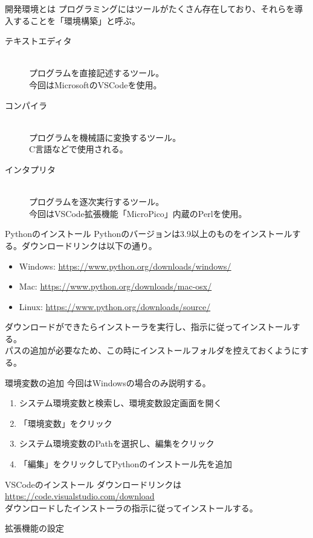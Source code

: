\documentclass[dvipdfmx]{beamer}
\begin{document}
    \begin{frame}{開発環境とは}
      プログラミングにはツールがたくさん存在しており、それらを導入することを「環境構築」と呼ぶ。
      \begin{description}
        \item[\alert{テキストエディタ}] \mbox{}\\ プログラムを直接記述するツール。\\今回はMicrosoftのVSCodeを使用。
        \item[\alert{コンパイラ}] \mbox{}\\ プログラムを機械語に変換するツール。\\C言語などで使用される。
        \item[\alert{インタプリタ}] \mbox{}\\ プログラムを逐次実行するツール。\\今回はVSCode拡張機能「MicroPico」内蔵のPerlを使用。
      \end{description}
    \end{frame}
    \begin{frame}{Pythonのインストール}
      Pythonのバージョンは3.9以上のものをインストールする。ダウンロードリンクは以下の通り。
      \begin{itemize}
        \item Windows: \url{https://www.python.org/downloads/windows/}
        \item Mac: \url{https://www.python.org/downloads/mac-osx/}
        \item Linux: \url{https://www.python.org/downloads/source/}
      \end{itemize}
      \vfill
      ダウンロードができたらインストーラを実行し、指示に従って\alert{インストール}する。\\
      パスの追加が必要なため、この時にインストールフォルダを控えておくようにする。
    \end{frame}
    \begin{frame}{環境変数の追加}
      今回はWindowsの場合のみ説明する。
      \begin{enumerate}
        \item システム環境変数と検索し、環境変数設定画面を開く
        \item 「環境変数」をクリック
        \item システム環境変数のPathを選択し、編集をクリック
        \item 「編集」をクリックしてPythonのインストール先を追加
      \end{enumerate}
    \end{frame}
    \begin{frame}{VSCodeのインストール}
        ダウンロードリンクは \url{https://code.visualstudio.com/download}\\
        ダウンロードしたインストーラの指示に従ってインストールする。
    \end{frame}
    \begin{frame}{拡張機能の設定}
        
    \end{frame}
\end{document}
